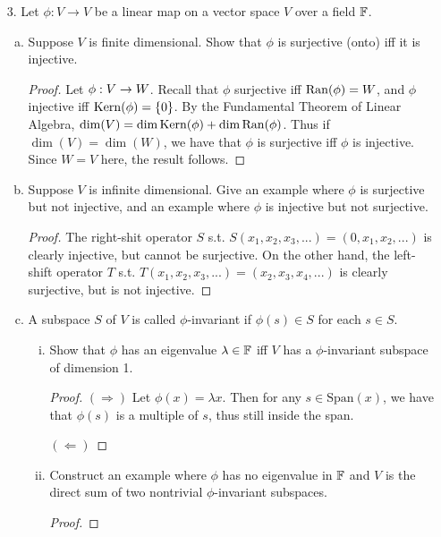 \begin{itemize}
\item[3.] Let $\phi : V \rightarrow V$ be a linear map on a vector space $V$ over a field $\mathbb{F}$.
\begin{enumerate}[(a)]
\item Suppose $V$ is finite dimensional. Show that $\phi$ is surjective (onto) iff it is injective. 
\begin{proof}
Let $\phi : V \rightarrow W$. Recall that $\phi$ surjective iff $\operatorname{Ran}(\phi) = W$, and $\phi$ injective iff $\operatorname{Kern}(\phi) = \{0\}$. By the Fundamental Theorem of Linear Algebra, $\dim(V) = \dim\operatorname{Kern}(\phi) + \dim\operatorname{Ran}(\phi)$. Thus if $\dim(V) = \dim(W)$, we have that $\phi$ is surjective iff $\phi$ is injective. Since $W=V$ here, the result follows.
\end{proof}

\item Suppose $V$ is infinite dimensional. Give an example where $\phi$ is surjective but not injective, and an example where $\phi$ is injective but not surjective.
\begin{proof}
The right-shit operator $S$ s.t. $S(x_1, x_2, x_3,...) = (0, x_1, x_2, ...)$  is clearly injective, but cannot be surjective. On the other hand, the left-shift operator $T$ s.t. $T(x_1, x_2, x_3,...) = (x_2, x_3, x_4, ...)$ is clearly surjective, but is not injective.
\end{proof}

\item A subspace $S$ of $V$ is called $\phi$-invariant if $\phi(s) \in S$ for each $s \in S$.
    \begin{enumerate}[(i)]
        \item Show that $\phi$ has an eigenvalue $\lambda \in \mathbb{F}$ iff $V$ has a $\phi$-invariant subspace of dimension 1.
        \begin{proof}
        $(\Rightarrow)$ Let $\phi(x) = \lambda x$. Then for any $s \in \text{Span}(x)$, we have that $\phi(s)$ is a multiple of $s$, thus still inside the span.

        $(\Leftarrow)$ 
        \end{proof}
        
        \item Construct an example where $\phi$ has no eigenvalue in $\mathbb{F}$ and $V$ is the direct sum of two nontrivial $\phi$-invariant subspaces. 
        \begin{proof}

        \end{proof}
    \end{enumerate}


\end{enumerate}
\end{itemize}
